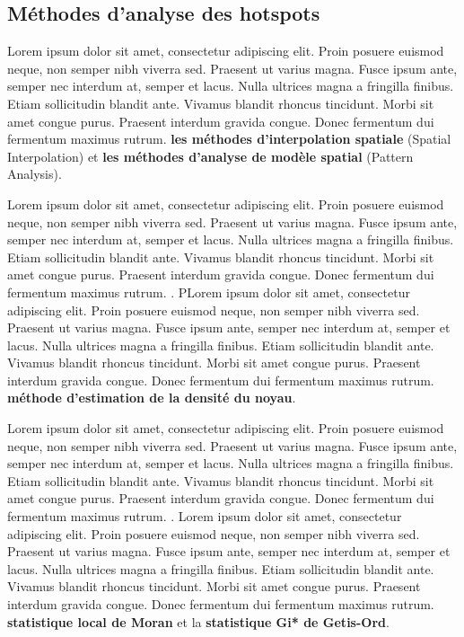 \subsection{Méthodes d'analyse des hotspots}

Lorem ipsum dolor sit amet, consectetur adipiscing elit. Proin posuere euismod neque, non semper nibh viverra sed. Praesent ut varius magna. Fusce ipsum ante, semper nec interdum at, semper et lacus. Nulla ultrices magna a fringilla finibus. Etiam sollicitudin blandit ante. Vivamus blandit rhoncus tincidunt. Morbi sit amet congue purus. Praesent interdum gravida congue. Donec fermentum dui fermentum maximus rutrum. \textbf{les méthodes d'interpolation spatiale} (Spatial Interpolation) et \textbf{les méthodes d'analyse de modèle spatial} (Pattern Analysis).

\medskip

Lorem ipsum dolor sit amet, consectetur adipiscing elit. Proin posuere euismod neque, non semper nibh viverra sed. Praesent ut varius magna. Fusce ipsum ante, semper nec interdum at, semper et lacus. Nulla ultrices magna a fringilla finibus. Etiam sollicitudin blandit ante. Vivamus blandit rhoncus tincidunt. Morbi sit amet congue purus. Praesent interdum gravida congue. Donec fermentum dui fermentum maximus rutrum. \parencite{chang_introduction_2019}. PLorem ipsum dolor sit amet, consectetur adipiscing elit. Proin posuere euismod neque, non semper nibh viverra sed. Praesent ut varius magna. Fusce ipsum ante, semper nec interdum at, semper et lacus. Nulla ultrices magna a fringilla finibus. Etiam sollicitudin blandit ante. Vivamus blandit rhoncus tincidunt. Morbi sit amet congue purus. Praesent interdum gravida congue. Donec fermentum dui fermentum maximus rutrum. \textbf{méthode d'estimation de la densité du noyau}.

\medskip

Lorem ipsum dolor sit amet, consectetur adipiscing elit. Proin posuere euismod neque, non semper nibh viverra sed. Praesent ut varius magna. Fusce ipsum ante, semper nec interdum at, semper et lacus. Nulla ultrices magna a fringilla finibus. Etiam sollicitudin blandit ante. Vivamus blandit rhoncus tincidunt. Morbi sit amet congue purus. Praesent interdum gravida congue. Donec fermentum dui fermentum maximus rutrum. \parencite{chang_introduction_2019}. Lorem ipsum dolor sit amet, consectetur adipiscing elit. Proin posuere euismod neque, non semper nibh viverra sed. Praesent ut varius magna. Fusce ipsum ante, semper nec interdum at, semper et lacus. Nulla ultrices magna a fringilla finibus. Etiam sollicitudin blandit ante. Vivamus blandit rhoncus tincidunt. Morbi sit amet congue purus. Praesent interdum gravida congue. Donec fermentum dui fermentum maximus rutrum. \textbf{statistique local de Moran} et la \textbf{statistique Gi* de Getis-Ord}.

